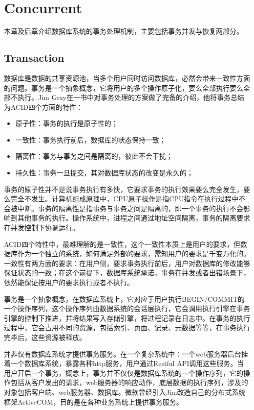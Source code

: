 \chapter{Concurrent}\label{chap:concurrent}

本章及后章介绍数据库系统的事务处理机制，主要包括事务并发与恢复两部分。

\section{Transaction}

数据库是数据的共享资源池，当多个用户同时访问数据库，必然会带来一致性方面的问题。事务是一个抽象概念，它将用户的多个操作原子化，要么全部执行要么全部不执行。Jim Gray在\cite{Gray1992Transaction}一书中对事务处理的方案做了完备的介绍，他将事务总结为ACID四个方面的特性：
\begin{itemize}
    \item 原子性：事务的执行是原子性的；
    \item 一致性：事务执行前后，数据库的状态保持一致；
    \item 隔离性：事务与事务之间是隔离的，彼此不会干扰；
    \item 持久性：事务一旦提交，其对数据库状态的改变是永久的；
\end{itemize}

事务的原子性并不是说事务执行有多快，它要求事务的执行效果要么完全发生，要么完全不发生。计算机组成原理中，CPU原子操作是指CPU指令在执行过程中不会被中断。事务的隔离性是指事务与事务之间是隔离的，即一个事务的执行不会影响到其他事务的执行。操作系统中，进程之间通过地址空间隔离，事务的隔离要求在并发控制下协调运行。

ACID四个特性中，最难理解的是一致性，这个一致性本质上是用户的要求，但数据库作为一个独立的系统，如何满足外部的要求，需知用户的要求是千变万化的。一致性有两方面的要求：在用户侧，要求事务执行前后，用户对数据库的修改能够保证状态的一致；在这个前提下，数据库系统承诺，事务在并发或者出错场景下，依然能保证按用户的要求执行或者不执行。

事务是一个抽象概念，在数据库系统上，它对应于用户执行BEGIN/COMMIT的一个操作序列，这个操作序列由数据系统的会话层执行，它会调用执行引擎在事务引擎的控制下推进，并将结果写入存储引擎，将过程记录在日志中。在事务的执行过程中，它会占用不同的资源，包括索引、页面、记录、元数据等等，在事务执行完毕后，这些资源被释放。

并非仅有数据库系统才提供事务服务。在一个复杂系统中：一个web服务器后台挂着一个数据库系统，暴露各种http服务，用户通过Restful API调用这些服务。当用户开启一个事务，概念上，事务并不仅仅是数据库系统的一个操作序列，它的操作包括从客户发出的请求，web服务器的响应动作，底层数据的执行序列，涉及的对象包括客户端、web服务器、数据库。微软曾经引入Jim改造自己的分布式系统框架ActiveCOM，目的是在各种业务系统上提供事务服务。

